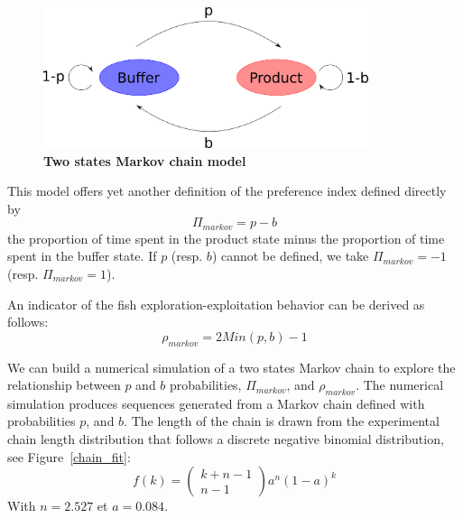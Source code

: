   \begin{figure}[h]
    \centering
    \includegraphics[width=0.85\textwidth]{part_2/assets/model.png}
    \caption{\textbf{Two states Markov chain model}}
    \label{markov_model}
  \end{figure}

  This model offers yet another definition of the preference index defined directly by
  \begin{equation}
    \Pi_{markov} = p - b
  \end{equation}
  \noindent the proportion of time spent in the product state minus the proportion of time spent in the buffer state. If $p$ (resp. $b$) cannot be defined, we take $\Pi_{markov} = -1$ (resp. $\Pi_{markov} = 1$).

 An indicator of the fish exploration-exploitation behavior can be derived as follows:
  \begin{equation}
    \rho_{markov} = 2Min(p,b) - 1
  \end{equation}

  We can build a numerical simulation of a two states Markov chain to explore the relationship between $p$ and $b$ probabilities, $\Pi_{markov}$, and $\rho_{markov}$. The numerical simulation produces sequences generated from a Markov chain defined with probabilities $p$, and $b$. The length of the chain is drawn from the experimental chain length distribution that follows a discrete negative binomial distribution, see Figure~\ref{chain_fit}:
  \begin{equation}
    f(k) = \begin{pmatrix}
    k+n-1\\
    n-1
    \end{pmatrix}
    a^n(1-a)^k
  \end{equation}
  \noindent With $n=2.527$ et $a=0.084$.

